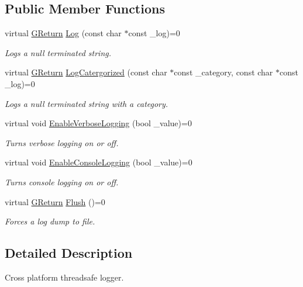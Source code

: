 \subsection*{Public Member Functions}
\begin{DoxyCompactItemize}
\item 
virtual \hyperlink{namespaceGW_a67a839e3df7ea8a5c5686613a7a3de21}{G\+Return} \hyperlink{classGW_1_1SYSTEM_1_1GLog_a9e21e702d012065fe799b4c49f7ac670}{Log} (const char $\ast$const \+\_\+log)=0
\begin{DoxyCompactList}\small\item\em Logs a null terminated string. \end{DoxyCompactList}\item 
virtual \hyperlink{namespaceGW_a67a839e3df7ea8a5c5686613a7a3de21}{G\+Return} \hyperlink{classGW_1_1SYSTEM_1_1GLog_a5d10397fa6aeeebaf8430df6029ec3c5}{Log\+Catergorized} (const char $\ast$const \+\_\+category, const char $\ast$const \+\_\+log)=0
\begin{DoxyCompactList}\small\item\em Logs a null terminated string with a category. \end{DoxyCompactList}\item 
virtual void \hyperlink{classGW_1_1SYSTEM_1_1GLog_a4323c96541a34fb0344828a1c20ec254}{Enable\+Verbose\+Logging} (bool \+\_\+value)=0
\begin{DoxyCompactList}\small\item\em Turns verbose logging on or off. \end{DoxyCompactList}\item 
virtual void \hyperlink{classGW_1_1SYSTEM_1_1GLog_abceb9fdf502b11f2fe72de5edd8f187d}{Enable\+Console\+Logging} (bool \+\_\+value)=0
\begin{DoxyCompactList}\small\item\em Turns console logging on or off. \end{DoxyCompactList}\item 
virtual \hyperlink{namespaceGW_a67a839e3df7ea8a5c5686613a7a3de21}{G\+Return} \hyperlink{classGW_1_1SYSTEM_1_1GLog_a07147c15ecb17caa1c83974b3c54f7d4}{Flush} ()=0
\begin{DoxyCompactList}\small\item\em Forces a log dump to file. \end{DoxyCompactList}\end{DoxyCompactItemize}


\subsection{Detailed Description}
Cross platform threadsafe logger. 

